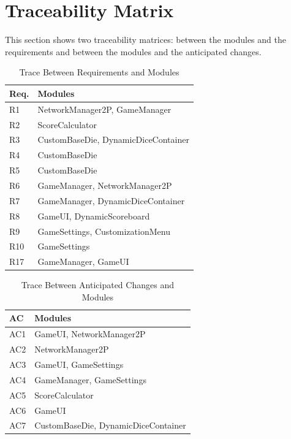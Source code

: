 \documentclass[12pt, titlepage]{article}
\begin{document}
\newpage
\section{Traceability Matrix} \label{SecTM}

This section shows two traceability matrices: between the modules and the
requirements and between the modules and the anticipated changes.

\begin{table}[H]
  \centering
  \begin{tabular}{p{} p{}}
  \toprule
  \textbf{Req.} & \textbf{Modules}\\
  \midrule
  R1 & NetworkManager2P, GameManager\\
  R2 & ScoreCalculator\\
  R3 & CustomBaseDie, DynamicDiceContainer\\
  R4 & CustomBaseDie\\
  R5 & CustomBaseDie\\
  R6 & GameManager, NetworkManager2P\\
  R7 & GameManager, DynamicDiceContainer\\
  R8 & GameUI, DynamicScoreboard\\
  R9 & GameSettings, CustomizationMenu\\
  R10 & GameSettings\\
  R17 & GameManager, GameUI\\
  \bottomrule
  \end{tabular}
  \caption{Trace Between Requirements and Modules}
  \label{TblRT}
  \end{table}
  
  \begin{table}[H]
  \centering
  \begin{tabular}{p{} p{}}
  \toprule
  \textbf{AC} & \textbf{Modules}\\
  \midrule
  AC1 & GameUI, NetworkManager2P\\
  AC2 & NetworkManager2P\\
  AC3 & GameUI, GameSettings\\
  AC4 & GameManager, GameSettings\\
  AC5 & ScoreCalculator\\
  AC6 & GameUI\\
  AC7 & CustomBaseDie, DynamicDiceContainer\\
  \bottomrule
  \end{tabular}
  \caption{Trace Between Anticipated Changes and Modules}
  \label{TblACT}
  \end{table}
\end{document}
